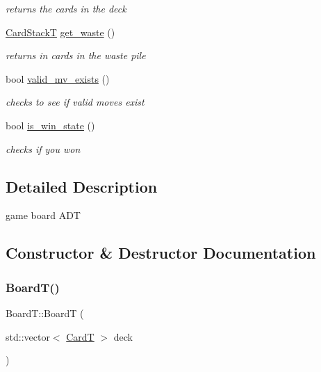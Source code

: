 \begin{DoxyCompactItemize}
\begin{DoxyCompactList}\small\item\em returns the cards in the deck \end{DoxyCompactList}\item 
\hyperlink{_card_stack_8h_a29a6854caf5fec306ee8fc0c6b453837}{Card\+StackT} \hyperlink{class_board_t_a1e3a7edd2e993d22a453da1487177585}{get\+\_\+waste} ()
\begin{DoxyCompactList}\small\item\em returns in cards in the waste pile \end{DoxyCompactList}\item 
bool \hyperlink{class_board_t_a9420e96ccd6692d0e63054277c5ef672}{valid\+\_\+mv\+\_\+exists} ()
\begin{DoxyCompactList}\small\item\em checks to see if valid moves exist \end{DoxyCompactList}\item 
bool \hyperlink{class_board_t_a163bed593a3f0ba24dd5401b595b75cd}{is\+\_\+win\+\_\+state} ()
\begin{DoxyCompactList}\small\item\em checks if you won \end{DoxyCompactList}\end{DoxyCompactItemize}


\subsection{Detailed Description}
game board A\+DT 

\subsection{Constructor \& Destructor Documentation}
\mbox{\label{class_board_t_a4a25fcb5e2e968e11d50bf6c1bb763a1}} 
\subsubsection{\texorpdfstring{Board\+T()}{BoardT()}}
{\footnotesize\ttfamily Board\+T\+::\+BoardT (\begin{DoxyParamCaption}\item[{std\+::vector$<$ \hyperlink{struct_card_t}{CardT} $>$}]{deck }\end{DoxyParamCaption})}



